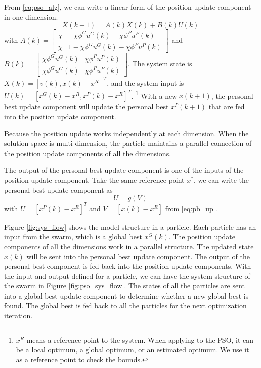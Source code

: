 From \eqref{eq:pso_alg}, we can write a linear form of the position update component in one dimension.
\begin{equation}
\label{eq:pso_up_linalg_simp}
X(k+1) = A(k) X(k) + B(k) U(k)
\end{equation}
with
$ A(k) = \begin{bmatrix}
\chi & - \chi \phi^{G} u^{G}(k) - \chi \phi^{P} u^{P}(k)
\\ 
\chi & 1 - \chi \phi^{G} u^{G}(k) - \chi \phi^{P} u^{P}(k)
\end{bmatrix} $
and
$ B(k) = \begin{bmatrix}
\chi \phi^{G} u^{G}(k) & \chi \phi^{P} u^{P}(k)
\\ 
\chi \phi^{G} u^{G}(k) & \chi \phi^{P} u^{P}(k)
\end{bmatrix} $.
The system state is $ X(k) = [ v(k), x(k) - x^{R} ]^{T} $, and the system input is $ U(k) = [ x^{G}(k) - x^{R} , x^{P}(k) - x^{R} ]^{T} $.
\footnote{$ x^{R} $ means a reference point to the system.
When applying to the PSO, it can be a local optimum, a global optimum, or an estimated optimum.
We use it as a reference point to check the bounds.}
With a new $ x(k+1) $, the personal best update component will update the personal best $ x^{P}(k+1) $ that are fed into the position update component.

Because the position update works independently at each dimension.
When the solution space is multi-dimension, the particle maintains a parallel connection of the position update components of all the dimensions.

The output of the personal best update component is one of the inputs of the position-update component.
Take the same reference point $ x^{*} $, we can write the personal best update component as 
\begin{equation}
\label{eq:pso_input_up}
U = g(V)
\end{equation}
with $ U = [ x^{P}(k) - x^{R} ]^{T} $ 
and $ V = [ x(k) - x^{R} ] $
from \eqref{eq:pb_up}. 

Figure \ref{fig:sys_flow} shows the model structure in a particle.
Each particle has an input from the swarm, which is a global best $ x^{G} (k) $.
The position update components of all the dimensions work in a parallel structure.
The updated state $ x (k) $ will be sent into the personal best update component.
The output of the personal best component is fed back into the position update components.
With the input and output defined for a particle, we can have the system structure of the swarm in Figure \ref{fig:pso_sys_flow}.
The states of all the particles are sent into a global best update component to determine whether a new global best is found.
The global best is fed back to all the particles for the next optimization iteration.

